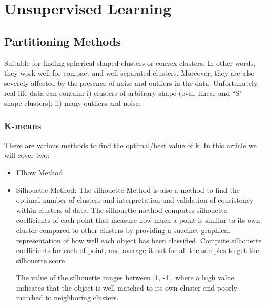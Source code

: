 
\chapter{Unsupervised Learning} %

\label{Chapter2} %


\section{Partitioning Methods}

Suitable for finding spherical-shaped clusters or convex clusters. In other words, they work well for compact and well separated clusters. Moreover, they are also severely affected by the presence of noise and outliers in the data. Unfortunately, real life data can contain: i) clusters of arbitrary shape (oval, linear and “S” shape clusters); ii) many outliers and noise.
\subsection{K-means}
There are various methods to find the optimal/best value of k. In this article we will cover two:

\begin{itemize}
\item Elbow Method

\item Silhouette Method: The silhouette Method is also a method to find the optimal number of clusters and interpretation and validation of consistency within clusters of data. The silhouette method computes silhouette coefficients of each point that measure how much a point is similar to its own cluster compared to other clusters by providing a succinct graphical representation of how well each object has been classified. Compute silhouette coefficients for each of point, and average it out for all the samples to get the silhouette score

The value of the silhouette ranges between [1, -1], where a high value indicates that the object is well matched to its own cluster and poorly matched to neighboring clusters.
    
\end{itemize}

